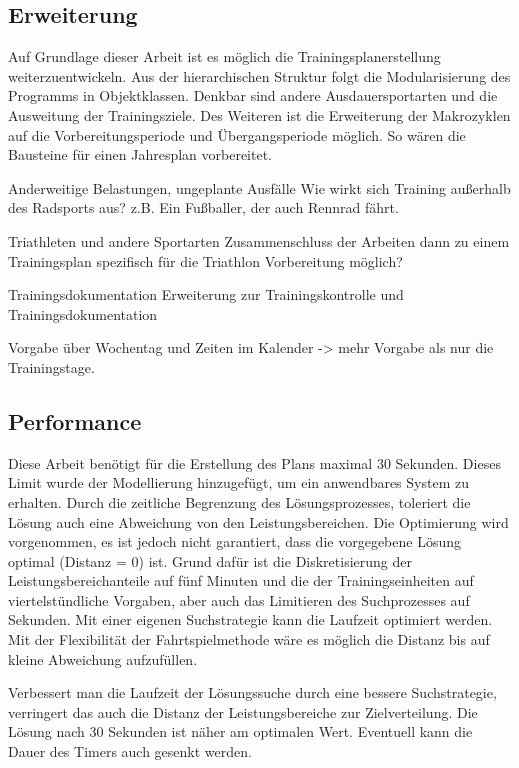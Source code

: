 \subsection{Erweiterung} 
Auf Grundlage dieser Arbeit ist es möglich die Trainingsplanerstellung weiterzuentwickeln. 
Aus der hierarchischen Struktur folgt die Modularisierung des Programms in Objektklassen.
Denkbar sind andere Ausdauersportarten und die Ausweitung der Trainingsziele. 
Des Weiteren ist die Erweiterung der Makrozyklen auf die Vorbereitungsperiode und Übergangsperiode möglich. So wären die Bausteine für einen Jahresplan vorbereitet. \par
Anderweitige Belastungen, ungeplante Ausfälle
Wie wirkt sich Training außerhalb des Radsports aus? z.B. Ein Fußballer, der auch Rennrad fährt. \par
Triathleten und andere Sportarten
Zusammenschluss der Arbeiten dann zu einem Trainingsplan spezifisch für die Triathlon Vorbereitung möglich? \par
Trainingsdokumentation
Erweiterung zur Trainingskontrolle und Trainingsdokumentation \par
Vorgabe über Wochentag und Zeiten im Kalender -> mehr Vorgabe als nur die Trainingstage.

\subsection{Performance}
Diese Arbeit benötigt für die Erstellung des Plans maximal 30 Sekunden. Dieses Limit wurde der Modellierung hinzugefügt, um ein anwendbares System zu erhalten. Durch die zeitliche Begrenzung des Lösungsprozesses, toleriert die Lösung auch eine Abweichung von den Leistungsbereichen. Die Optimierung wird vorgenommen, es ist jedoch nicht garantiert, dass die vorgegebene Lösung optimal (Distanz = 0) ist. Grund dafür ist die Diskretisierung der Leistungsbereichanteile auf fünf Minuten und die der Trainingseinheiten auf viertelstündliche Vorgaben, aber auch das Limitieren des Suchprozesses auf  Sekunden.
Mit einer eigenen Suchstrategie kann die Laufzeit optimiert werden. Mit der Flexibilität der Fahrtspielmethode wäre es möglich die Distanz bis auf kleine Abweichung aufzufüllen.

Verbessert man die Laufzeit der Lösungssuche durch eine bessere Suchstrategie, verringert das auch die Distanz der Leistungsbereiche zur Zielverteilung. Die Lösung nach 30 Sekunden ist näher am optimalen Wert. Eventuell kann die Dauer des Timers auch gesenkt werden.

